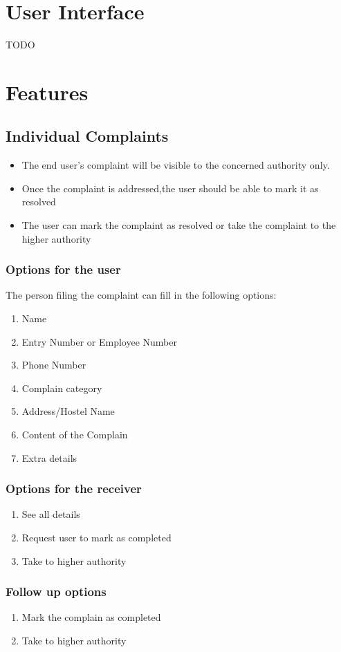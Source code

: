 \documentclass{article}
\begin{document}
	\section{User Interface}
	TODO
	\section{Features}
		\subsection{Individual Complaints}
		\begin{itemize}
		\item The end user's complaint will be visible to the concerned authority only.
		\item Once the complaint is addressed,the user should be able to mark it as resolved
		\item The user can mark the complaint as resolved or take the complaint to the higher authority
		\end{itemize}
			\subsubsection{Options for the user}
				The person filing the complaint can fill in the following options:
				\begin{enumerate}
					\item Name
					\item Entry Number or Employee Number
					\item Phone Number
					\item Complain category
					\item Address/Hostel Name
					\item Content of the Complain
					\item Extra details
				\end{enumerate}
			\subsubsection{Options for the receiver}
				\begin{enumerate}
					\item See all details
					\item Request user to mark as completed
					\item Take to higher authority
				\end{enumerate}
			\subsubsection{Follow up options}
				\begin{enumerate}
					\item Mark the complain as completed
					\item Take to higher authority
				\end{enumerate}
\end{document}
